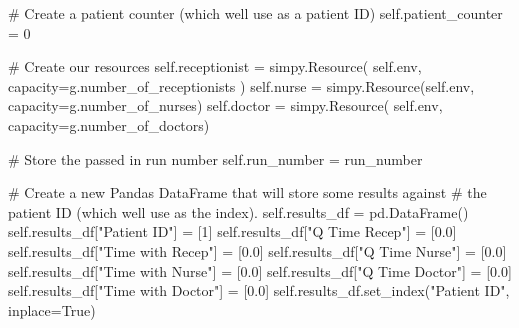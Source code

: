\documentclass[
  letterpaper,
  DIV=11,
  numbers=noendperiod]{scrreprt}
\newenvironment{Shaded}{\begin{snugshade}}{\end{snugshade}}
\newcommand{\CommentTok}[1]{\textcolor[rgb]{0.37,0.37,0.37}{#1}}
\newcommand{\DecValTok}[1]{\textcolor[rgb]{0.68,0.00,0.00}{#1}}
\newcommand{\FloatTok}[1]{\textcolor[rgb]{0.68,0.00,0.00}{#1}}
\newcommand{\NormalTok}[1]{\textcolor[rgb]{0.00,0.23,0.31}{#1}}
\newcommand{\OperatorTok}[1]{\textcolor[rgb]{0.37,0.37,0.37}{#1}}
\newcommand{\StringTok}[1]{\textcolor[rgb]{0.13,0.47,0.30}{#1}}
\newcommand{\VariableTok}[1]{\textcolor[rgb]{0.07,0.07,0.07}{#1}}
\begin{document}
\begin{tcolorbox}
\begin{Shaded}
\begin{Highlighting}[]
        \CommentTok{\# Create a patient counter (which we\textquotesingle{}ll use as a patient ID)}
        \VariableTok{self}\NormalTok{.patient\_counter }\OperatorTok{=} \DecValTok{0}

        \CommentTok{\# Create our resources}
        \VariableTok{self}\NormalTok{.receptionist }\OperatorTok{=}\NormalTok{ simpy.Resource(}
            \VariableTok{self}\NormalTok{.env, capacity}\OperatorTok{=}\NormalTok{g.number\_of\_receptionists}
\NormalTok{        )}
        \VariableTok{self}\NormalTok{.nurse }\OperatorTok{=}\NormalTok{ simpy.Resource(}\VariableTok{self}\NormalTok{.env, capacity}\OperatorTok{=}\NormalTok{g.number\_of\_nurses)}
        \VariableTok{self}\NormalTok{.doctor }\OperatorTok{=}\NormalTok{ simpy.Resource(}
            \VariableTok{self}\NormalTok{.env, capacity}\OperatorTok{=}\NormalTok{g.number\_of\_doctors)}

        \CommentTok{\# Store the passed in run number}
        \VariableTok{self}\NormalTok{.run\_number }\OperatorTok{=}\NormalTok{ run\_number}

        \CommentTok{\# Create a new Pandas DataFrame that will store some results against}
        \CommentTok{\# the patient ID (which we\textquotesingle{}ll use as the index).}
        \VariableTok{self}\NormalTok{.results\_df }\OperatorTok{=}\NormalTok{ pd.DataFrame()}
        \VariableTok{self}\NormalTok{.results\_df[}\StringTok{"Patient ID"}\NormalTok{] }\OperatorTok{=}\NormalTok{ [}\DecValTok{1}\NormalTok{]}
        \VariableTok{self}\NormalTok{.results\_df[}\StringTok{"Q Time Recep"}\NormalTok{] }\OperatorTok{=}\NormalTok{ [}\FloatTok{0.0}\NormalTok{]}
        \VariableTok{self}\NormalTok{.results\_df[}\StringTok{"Time with Recep"}\NormalTok{] }\OperatorTok{=}\NormalTok{ [}\FloatTok{0.0}\NormalTok{]}
        \VariableTok{self}\NormalTok{.results\_df[}\StringTok{"Q Time Nurse"}\NormalTok{] }\OperatorTok{=}\NormalTok{ [}\FloatTok{0.0}\NormalTok{]}
        \VariableTok{self}\NormalTok{.results\_df[}\StringTok{"Time with Nurse"}\NormalTok{] }\OperatorTok{=}\NormalTok{ [}\FloatTok{0.0}\NormalTok{]}
        \VariableTok{self}\NormalTok{.results\_df[}\StringTok{"Q Time Doctor"}\NormalTok{] }\OperatorTok{=}\NormalTok{ [}\FloatTok{0.0}\NormalTok{]}
        \VariableTok{self}\NormalTok{.results\_df[}\StringTok{"Time with Doctor"}\NormalTok{] }\OperatorTok{=}\NormalTok{ [}\FloatTok{0.0}\NormalTok{]}
        \VariableTok{self}\NormalTok{.results\_df.set\_index(}\StringTok{"Patient ID"}\NormalTok{, inplace}\OperatorTok{=}\VariableTok{True}\NormalTok{)}


\end{Highlighting}
\end{Shaded}
\end{tcolorbox}
\end{document}
